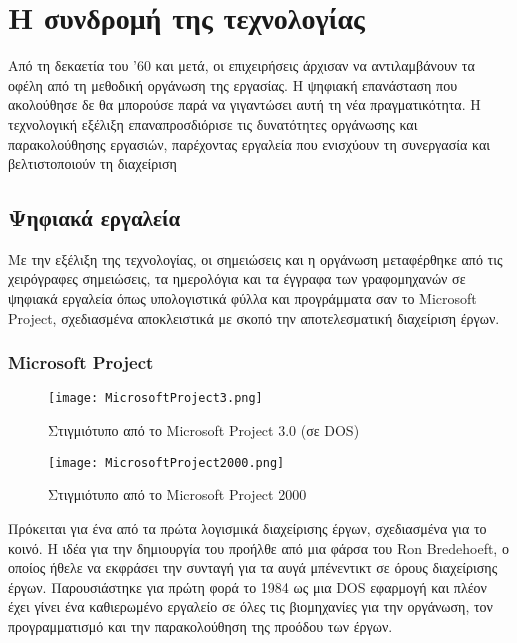     \section{Η συνδρομή της τεχνολογίας}
        Από τη δεκαετία του '60 και μετά, οι επιχειρήσεις άρχισαν να αντιλαμβάνουν τα οφέλη από τη μεθοδική οργάνωση της εργασίας. Η ψηφιακή επανάσταση που ακολούθησε δε θα μπορούσε παρά να γιγαντώσει αυτή τη νέα πραγματικότητα. Η τεχνολογική εξέλιξη επαναπροσδιόρισε τις δυνατότητες οργάνωσης και παρακολούθησης εργασιών, παρέχοντας εργαλεία που ενισχύουν τη συνεργασία και βελτιστοποιούν τη διαχείριση

        \subsection{Ψηφιακά εργαλεία}
            Με την εξέλιξη της τεχνολογίας, οι σημειώσεις και η οργάνωση μεταφέρθηκε από τις χειρόγραφες σημειώσεις, τα ημερολόγια και τα έγγραφα των γραφομηχανών σε ψηφιακά εργαλεία όπως υπολογιστικά φύλλα και προγράμματα σαν το Microsoft Project, σχεδιασμένα αποκλειστικά με σκοπό την αποτελεσματική διαχείριση έργων.

            \subsubsection{Microsoft Project}
                \begin{figure}[H] \noindent \centering
                    \texttt{[image: MicrosoftProject3.png]}
                    \caption{\centering Στιγμιότυπο από το Microsoft Project 3.0 (σε DOS) \cite{WinWorld}}
                \end{figure}

                \begin{figure}[H] \noindent \centering
                    \texttt{[image: MicrosoftProject2000.png]}
                    \caption{\centering Στιγμιότυπο από το Microsoft Project 2000 \cite{WinWorld}}
                \end{figure}

                Πρόκειται για ένα από τα πρώτα λογισμικά διαχείρισης έργων, σχεδιασμένα για το κοινό. Η ιδέα για την δημιουργία του προήλθε από μια φάρσα του Ron Bredehoeft, ο οποίος ήθελε να εκφράσει την συνταγή για τα αυγά μπένεντικτ σε όρους διαχείρισης έργων. Παρουσιάστηκε για πρώτη φορά το 1984 ως μια DOS εφαρμογή και πλέον έχει γίνει ένα καθιερωμένο εργαλείο σε όλες τις βιομηχανίες για την οργάνωση, τον προγραμματισμό και την παρακολούθηση της προόδου των έργων.

